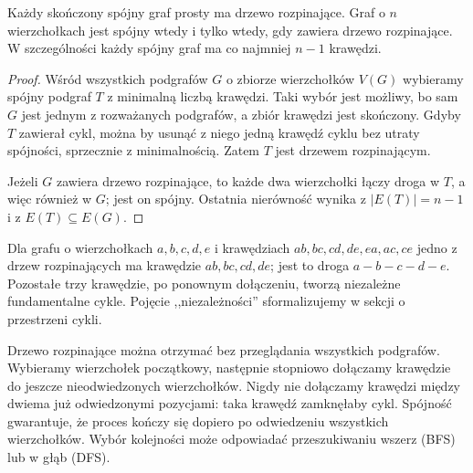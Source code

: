 \begin{twierdzenie}
Każdy skończony spójny graf prosty ma drzewo
rozpinające. Graf o $n$ wierzchołkach jest
spójny wtedy i tylko wtedy, gdy zawiera
drzewo rozpinające. W szczególności każdy
spójny graf ma co najmniej $n-1$ krawędzi.
\end{twierdzenie}

\begin{proof}
Wśród wszystkich podgrafów $G$ o zbiorze
wierzchołków $V(G)$ wybieramy spójny podgraf
$T$ z minimalną liczbą krawędzi. Taki wybór
jest możliwy, bo sam $G$ jest jednym z
rozważanych podgrafów, a zbiór krawędzi jest
skończony. Gdyby $T$ zawierał cykl, można
by usunąć z niego jedną krawędź cyklu
bez utraty spójności, sprzecznie z minimalnością.
Zatem $T$ jest drzewem rozpinającym.

Jeżeli $G$ zawiera drzewo rozpinające, to
każde dwa wierzchołki łączy droga w $T$, a więc
również w $G$; jest on spójny. Ostatnia
nierówność wynika z $|E(T)|=n-1$ i z
$E(T)\subseteq E(G)$.
\end{proof}

\begin{przyklad}
Dla grafu o wierzchołkach $a,b,c,d,e$ i krawędziach
$ab,bc,cd,de,ea,ac,ce$ jedno z drzew rozpinających
ma krawędzie $ab,bc,cd,de$; jest to droga
$a-b-c-d-e$. Pozostałe trzy krawędzie, po
ponownym dołączeniu, tworzą niezależne
fundamentalne cykle. Pojęcie ,,niezależności''
sformalizujemy w sekcji o przestrzeni cykli.
\end{przyklad}

\begin{center}
\end{center}

\begin{uwaga}
Drzewo rozpinające można otrzymać bez przeglądania
wszystkich podgrafów. Wybieramy wierzchołek
początkowy, następnie stopniowo dołączamy
krawędzie do jeszcze nieodwiedzonych wierzchołków.
Nigdy nie dołączamy krawędzi między dwiema
już odwiedzonymi pozycjami: taka krawędź
zamknęłaby cykl. Spójność gwarantuje, że
proces kończy się dopiero po odwiedzeniu
wszystkich wierzchołków. Wybór kolejności
może odpowiadać przeszukiwaniu wszerz (BFS)
lub w głąb (DFS).
\end{uwaga}


